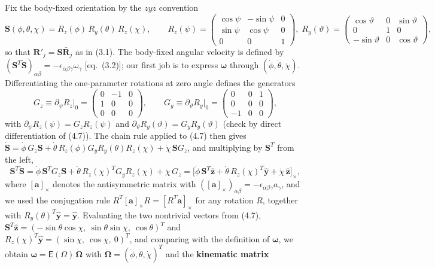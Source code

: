 Fix the body-fixed orientation by the $zyz$ convention
\begin{equation}
\mathbf S(\phi,\theta,\chi)=R_z(\phi)\,R_y(\theta)\,R_z(\chi),\qquad
R_z(\psi)=\!\begin{pmatrix}\cos\psi&-\sin\psi&0\\ \sin\psi&\cos\psi&0\\ 0&0&1\end{pmatrix},\;
R_y(\vartheta)=\!\begin{pmatrix}\cos\vartheta&0&\sin\vartheta\\ 0&1&0\\ -\sin\vartheta&0&\cos\vartheta\end{pmatrix}, \tag{4.7}
\end{equation}
so that $\mathbf R'_j=\mathbf S\bar{\mathbf R}_j$ as in (3.1). The body-fixed angular velocity is defined by $(\mathbf S^{T}\dot{\mathbf S})_{\alpha\beta}=-\epsilon_{\alpha\beta\gamma}\omega_\gamma$ [eq.~(3.2)]; our first job is to express $\boldsymbol\omega$ through $(\dot\phi,\dot\theta,\dot\chi)$. Differentiating the one-parameter rotations at zero angle defines the generators
\begin{equation}
G_z\equiv\partial_\psi R_z\big|_{0}=\begin{pmatrix}0&-1&0\\1&0&0\\0&0&0\end{pmatrix},\qquad
G_y\equiv\partial_\vartheta R_y\big|_{0}=\begin{pmatrix}0&0&1\\0&0&0\\-1&0&0\end{pmatrix}, \tag{4.8}
\end{equation}
with $\partial_\psi R_z(\psi)=G_zR_z(\psi)$ and $\partial_\vartheta R_y(\vartheta)=G_yR_y(\vartheta)$ (check by direct differentiation of (4.7)). The chain rule applied to (4.7) then gives $\dot{\mathbf S}=\dot\phi\,G_z\mathbf S+\dot\theta\,R_z(\phi)G_yR_y(\theta)R_z(\chi)+\dot\chi\,\mathbf S G_z$, and multiplying by $\mathbf S^{T}$ from the left,
\begin{equation}
\mathbf S^{T}\dot{\mathbf S}
=\dot\phi\,\mathbf S^{T}G_z\mathbf S
+\dot\theta\,R_z(\chi)^{T}G_yR_z(\chi)
+\dot\chi\,G_z
=\bigl[\dot\phi\,\mathbf S^{T}\hat{\mathbf z}+\dot\theta\,R_z(\chi)^{T}\hat{\mathbf y}+\dot\chi\,\hat{\mathbf z}\bigr]_\times , \tag{4.9}
\end{equation}
where $[\mathbf a]_\times$ denotes the antisymmetric matrix with $([\mathbf a]_\times)_{\alpha\beta}=-\epsilon_{\alpha\beta\gamma}a_\gamma$, and we used the conjugation rule $R^{T}[\mathbf a]_\times R=[R^{T}\mathbf a]_\times$ for any rotation $R$, together with $R_y(\theta)^{T}\hat{\mathbf y}=\hat{\mathbf y}$. Evaluating the two nontrivial vectors from (4.7), $\mathbf S^{T}\hat{\mathbf z}=(-\sin\theta\cos\chi,\ \sin\theta\sin\chi,\ \cos\theta)^{T}$ and $R_z(\chi)^{T}\hat{\mathbf y}=(\sin\chi,\ \cos\chi,\ 0)^{T}$, and comparing with the definition of $\boldsymbol\omega$, we obtain $\boldsymbol\omega=\mathsf E(\Omega)\,\dot{\boldsymbol\Omega}$ with $\dot{\boldsymbol\Omega}=(\dot\phi,\dot\theta,\dot\chi)^{T}$ and the \textbf{kinematic matrix}
